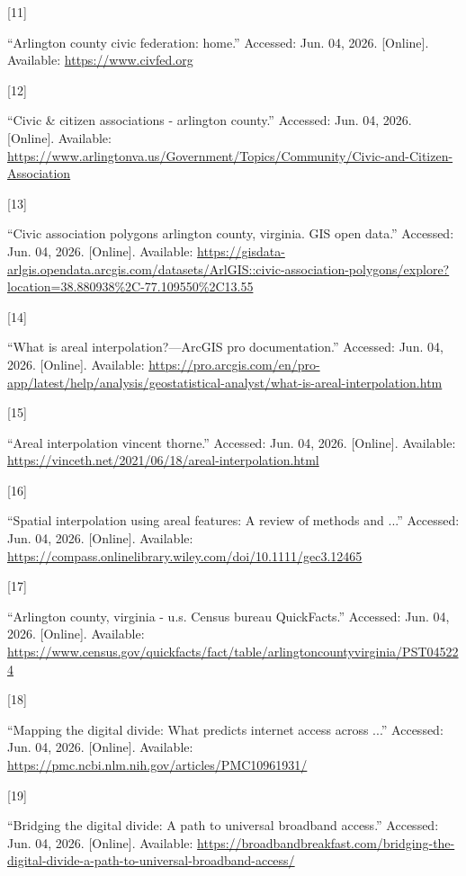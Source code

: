 \documentclass[
  letterpaper,
  DIV=11,
  numbers=noendperiod]{scrreprt}
\newlength{\cslhangindent}
\newlength{\csllabelwidth}
\newenvironment{CSLReferences}[2] %
 {\begin{list}{}{%
  \setlength{\itemindent}{0pt}
  \setlength{\leftmargin}{0pt}
  \setlength{\parsep}{0pt}
  \ifodd #1
   \setlength{\leftmargin}{\cslhangindent}
   \setlength{\itemindent}{-1\cslhangindent}
  \fi
  \setlength{\itemsep}{#2\baselineskip}}}
 {\end{list}}
\newcommand{\CSLLeftMargin}[1]{\parbox[t]{\csllabelwidth}{\strut#1\strut}}
\newcommand{\CSLRightInline}[1]{\parbox[t]{\linewidth - \csllabelwidth}{\strut#1\strut}}
\begin{document}
\begin{CSLReferences}{0}{0}
\CSLLeftMargin{{[}11{]} }%
\CSLRightInline{{``Arlington county civic federation: home.''} Accessed:
Jun. 04, 2026. {[}Online{]}. Available: \url{https://www.civfed.org}}

\CSLLeftMargin{{[}12{]} }%
\CSLRightInline{{``Civic \& citizen associations - arlington county.''}
Accessed: Jun. 04, 2026. {[}Online{]}. Available:
\url{https://www.arlingtonva.us/Government/Topics/Community/Civic-and-Citizen-Association}}

\CSLLeftMargin{{[}13{]} }%
\CSLRightInline{{``Civic association polygons \textbar{} arlington
county, virginia. GIS open data.''} Accessed: Jun. 04, 2026.
{[}Online{]}. Available:
\url{https://gisdata-arlgis.opendata.arcgis.com/datasets/ArlGIS::civic-association-polygons/explore?location=38.880938\%2C-77.109550\%2C13.55}}

\CSLLeftMargin{{[}14{]} }%
\CSLRightInline{{``What is areal interpolation?---ArcGIS pro \textbar{}
documentation.''} Accessed: Jun. 04, 2026. {[}Online{]}. Available:
\url{https://pro.arcgis.com/en/pro-app/latest/help/analysis/geostatistical-analyst/what-is-areal-interpolation.htm}}

\CSLLeftMargin{{[}15{]} }%
\CSLRightInline{{``Areal interpolation \textbar{} vincent thorne.''}
Accessed: Jun. 04, 2026. {[}Online{]}. Available:
\url{https://vinceth.net/2021/06/18/areal-interpolation.html}}

\CSLLeftMargin{{[}16{]} }%
\CSLRightInline{{``Spatial interpolation using areal features: A review
of methods and ...''} Accessed: Jun. 04, 2026. {[}Online{]}. Available:
\url{https://compass.onlinelibrary.wiley.com/doi/10.1111/gec3.12465}}

\CSLLeftMargin{{[}17{]} }%
\CSLRightInline{{``Arlington county, virginia - u.s. Census bureau
QuickFacts.''} Accessed: Jun. 04, 2026. {[}Online{]}. Available:
\url{https://www.census.gov/quickfacts/fact/table/arlingtoncountyvirginia/PST045224}}

\CSLLeftMargin{{[}18{]} }%
\CSLRightInline{{``Mapping the digital divide: What predicts internet
access across ...''} Accessed: Jun. 04, 2026. {[}Online{]}. Available:
\url{https://pmc.ncbi.nlm.nih.gov/articles/PMC10961931/}}

\CSLLeftMargin{{[}19{]} }%
\CSLRightInline{{``Bridging the digital divide: A path to universal
broadband access.''} Accessed: Jun. 04, 2026. {[}Online{]}. Available:
\url{https://broadbandbreakfast.com/bridging-the-digital-divide-a-path-to-universal-broadband-access/}}


\end{CSLReferences}
\end{document}
